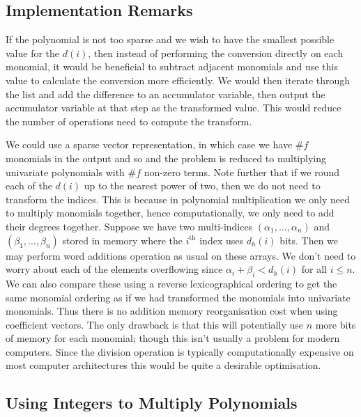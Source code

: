 \subsection{Implementation Remarks}
\label{sub:implementation-kroncker}

If the polynomial is not too sparse and we wish to have the smallest possible value for the $d(i)$, then instead of performing the conversion directly on each monomial, it would be beneficial to subtract adjacent monomials and use this value to calculate the conversion more efficiently. We would then iterate through the list and add the difference to an accumulator variable, then output the accumulator variable at that step as the transformed value. This would reduce the number of operations need to compute the transform.

We could use a sparse vector representation, in which case we have $\# f$ monomials in the output and so and the problem is reduced to multiplying univariate polynomials with $\# f$ non-zero terms. Note further that if we round each of the $d(i)$ up to the nearest power of two, then we do not need to transform the indices. This is because in polynomial multiplication we only need to multiply monomials together, hence computationally, we only need to add their degrees together. Suppose we have two multi-indices $(\alpha_1, \ldots, \alpha_n)$ and $(\beta_1, \ldots, \beta_n)$ stored in memory where the $i^{\text{th}}$ index uses $d_h(i)$ bits. Then we may perform word additions operation as usual on these arrays. We don't need to worry about each of the elements overflowing since $\alpha_i + \beta_i < d_h(i)$ for all $i \le n$. We can also compare these using a reverse lexicographical ordering to get the same monomial ordering as if we had transformed the monomials into univariate monomials. Thus there is no addition memory reorganisation cost when using coefficient vectors. The only drawback is that this will potentially use $n$ more bits of memory for each monomial; though this isn't usually a problem for modern computers. Since the division operation is typically computationally expensive on most computer architectures \cite{instruction-times} this would be quite a desirable optimisation.

\medskip

\subsection{Using Integers to Multiply Polynomials}%
\label{sub:integers-for-poly-mult}


